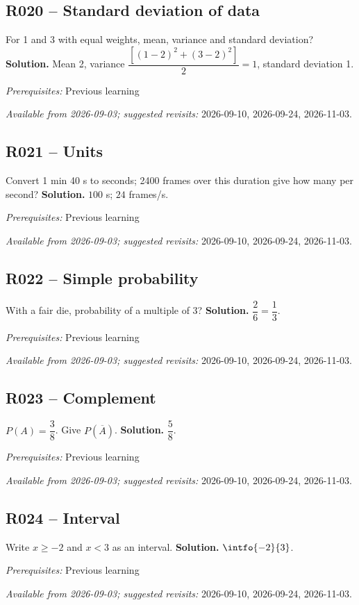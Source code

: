 \subsection*{R020 -- Standard deviation of data}\label{R020}
For 1 and 3 with equal weights, mean, variance and standard deviation?
\ifmxteacher\textbf{Solution.} Mean 2, variance $\dfrac{[(1-2)^2+(3-2)^2]}{2}=1$, standard deviation 1.\par\textit{Prerequisites:} Previous learning\par\textit{Available from 2026-09-03; suggested revisits:} 2026-09-10, 2026-09-24, 2026-11-03.\fi
{}\subsection*{R021 -- Units}\label{R021}
Convert 1 min 40 s to seconds; 2400 frames over this duration give how many per second?
\ifmxteacher\textbf{Solution.} $100$ s; $24$ frames/s.\par\textit{Prerequisites:} Previous learning\par\textit{Available from 2026-09-03; suggested revisits:} 2026-09-10, 2026-09-24, 2026-11-03.\fi
{}\subsection*{R022 -- Simple probability}\label{R022}
With a fair die, probability of a multiple of 3?
\ifmxteacher\textbf{Solution.} $\dfrac{2}{6}=\dfrac{1}{3}$.\par\textit{Prerequisites:} Previous learning\par\textit{Available from 2026-09-03; suggested revisits:} 2026-09-10, 2026-09-24, 2026-11-03.\fi
{}\subsection*{R023 -- Complement}\label{R023}
$P(A)=\dfrac{3}{8}$. Give $P(\overline A)$.
\ifmxteacher\textbf{Solution.} $\dfrac{5}{8}$.\par\textit{Prerequisites:} Previous learning\par\textit{Available from 2026-09-03; suggested revisits:} 2026-09-10, 2026-09-24, 2026-11-03.\fi
{}\subsection*{R024 -- Interval}\label{R024}
Write $x\geq-2$ and $x<3$ as an interval.
\ifmxteacher\textbf{Solution.} $\intfo{-2}{3}$.\par\textit{Prerequisites:} Previous learning\par\textit{Available from 2026-09-03; suggested revisits:} 2026-09-10, 2026-09-24, 2026-11-03.\fi
